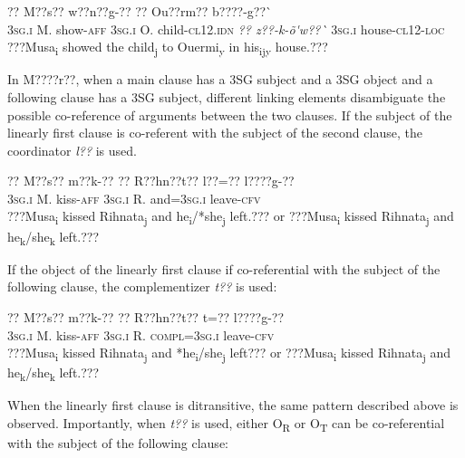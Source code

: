 \documentclass[output=paper]{langsci/langscibook}
\begin{document}
\ea  
\gll ??    M??s??  w??n??g-??  ??    Ou??rm??  b????-g??\`{ }    
\\
%
\textsc{3sg.i  }  M.  show-\textsc{aff}  \textsc{3sg.i  }  O.    child\textsc{{}-cl12.idn}    
  \textit{??    z??-k-\~{o}\'{ }w??\`{ }}
  \textsc{3sg.i  }  house-\textsc{cl12-loc}
\\\glt
???Musa\textsubscript{i} showed the child\textsubscript{j} to Ouermi\textsubscript{y} in his\textsubscript{ijy} house.??? 
\z


In M????r??, when a main clause has a 3SG subject and a 3SG object and a following clause has a 3SG subject, different linking elements disambiguate the possible co-reference of arguments between the two clauses. If the subject of the linearly first clause is co-referent with the subject of the second clause, the coordinator \textit{l??} is used.

\ea \gll 
??    M??s??  m??k-??    ??    R??hn??t??  l??=??      l????g-??
\\
%
\textsc{3sg.i  }  M.  kiss-\textsc{aff}  \textsc{3sg.i    }R.    and=\textsc{3sg.i  }  leave-\textsc{cfv}
\\\glt
???Musa\textsubscript{i} kissed Rihnata\textsubscript{j} and he\textsubscript{i}/*she\textsubscript{j} left.??? or ???Musa\textsubscript{i} kissed Rihnata\textsubscript{j} and he\textsubscript{k}/she\textsubscript{k} left.???
\z

If the object of the linearly first clause if co-referential with the subject of the following clause, the complementizer \textit{t??} is used:


\ea \gll 
??    M??s??  m??k-??    ??    R??hn??t??  t=??        l????g-??
\\
%
\textsc{3sg.i  }  M.  kiss-\textsc{aff}  \textsc{3sg.i  }  R.    \textsc{compl=3sg.i  }    leave-\textsc{cfv}
\\\glt
???Musa\textsubscript{i} kissed Rihnata\textsubscript{j} and *he\textsubscript{i}/she\textsubscript{j} left??? or ???Musa\textsubscript{i} kissed Rihnata\textsubscript{j} and he\textsubscript{k}/she\textsubscript{k} left.???
\z

When the linearly first clause is ditransitive, the same pattern described above is observed. Importantly, when \textit{t??} is used, either O\textsubscript{R} or O\textsubscript{T }can be co-referential with the subject of the following clause:
\end{document}
